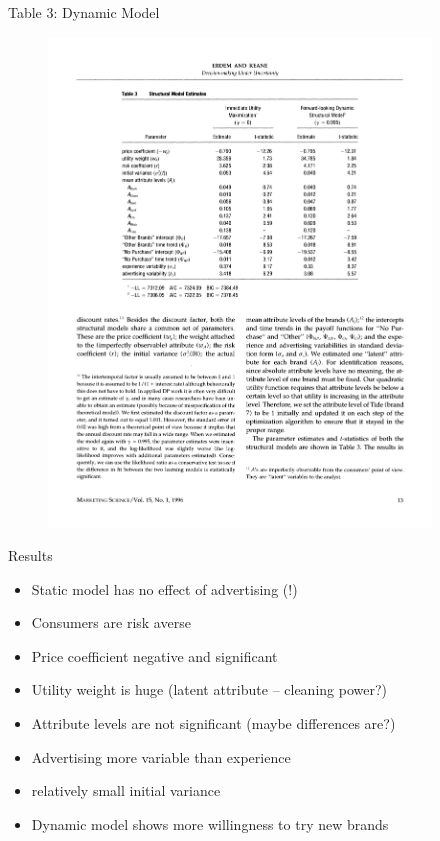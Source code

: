 \documentclass[xcolor=pdftex,dvipsnames,table,mathserif,aspectratio=169]{beamer}
\begin{document}
\begin{frame}{Table 3: Dynamic Model}
\begin{figure}[htbp]
\begin{center}
\includegraphics[width=4in]{resources/ek2.pdf}
\label{default}
\end{center}
\end{figure}
\end{frame}

\begin{frame}{Results}
\begin{itemize}
\item Static model has no effect of advertising (!)
\item Consumers are risk averse
\item Price coefficient negative and significant
\item Utility weight is huge (latent attribute -- cleaning power?)
\item Attribute levels are not significant (maybe differences are?)
\item Advertising more variable than experience
\item relatively small initial variance
\item Dynamic model shows \alert{more willingness to try new brands}
\end{itemize}
\end{frame}
\end{document}
